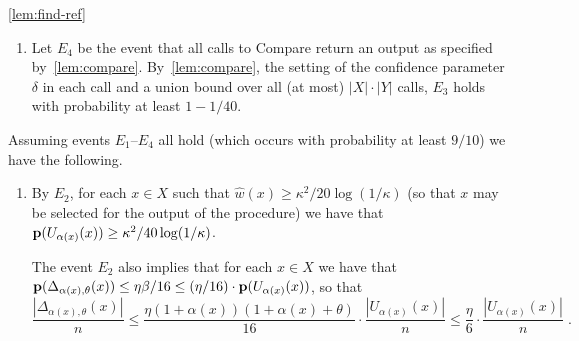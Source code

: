 \begin{proofof}{\cref{lem:find-ref}}
\begin{enumerate}
\begin{enumerate}
     $\theta$ is as specified by the algorithm). \\
  If $\frac{|\Delta_{\alpha(x),\theta}(x)|}{n}
      \geq \frac{\kappa^4}{240\log(1/\kappa)}$, then
   $\frac{|Y_x\cap \Delta_{\alpha(x),\theta}(x)|}{|Y_x|}
     \leq 2\cdot \frac{|\Delta_{\alpha(x),\theta}(x)|}{n}$;\\
   If $\frac{|\Delta_{\alpha(x),\theta}(x)|}{n}
        < \frac{\kappa^4}{240\log(1/\kappa)}$, then
   $\frac{|Y_x\cap \Delta_{\alpha(x),\theta}(x)|}{|Y_x|}
        < \frac{\kappa^4}{120\log(1/\kappa)}$.
   \end{enumerate}
  By the size of each set $Y_x$ and a union bound over all $x\in X$,
  the event $E_3$ holds with probability at least $1-1/40$.
\item Let $E_4$ be the event that all calls to {\sc Compare}
return an output as specified by~\cref{lem:compare}.
By~\cref{lem:compare}, the setting of
the confidence parameter $\delta$ in each call and a union bound
over all (at most) $|X|\cdot |Y|$ calls, $E_3$ holds with probability
at least $1-1/40$.
\end{enumerate}
Assuming events $E_1$--$E_4$ all hold (which occurs with
probability at least $9/10$) we have the following.
\begin{enumerate}
\item By $E_2$, for each $x \in X$
such that
$\hat{w}(x) \geq \kappa^2/20\log(1/\kappa)$
(so that $x$ may be
selected for the output of the procedure) we have that
$\mathbf{p}(U_{\alpha(x)}(x)) \geq \kappa^2/40\log(1/\kappa)$.

The event $E_2$ also implies that for each $x \in X$ we have that
$\mathbf{p}(\Delta_{\alpha(x),\theta}(x))\leq \eta\beta/16
    \leq (\eta/16)\cdot \mathbf{p}(U_{\alpha(x)}(x))$, so that
\begin{equation}\label{eq:Delta-size}
\frac{|\Delta_{\alpha(x),\theta}(x)|}{n}
\leq \frac{\eta(1+\alpha(x))(1+\alpha(x)+\theta)}
     {16}\cdot \frac{|U_{\alpha(x)}(x)|}{n}
\leq \frac{\eta}{6}\cdot \frac{|U_{\alpha(x)}(x)|}{n}\;.
\end{equation}


\end{enumerate}
\end{proofof}
